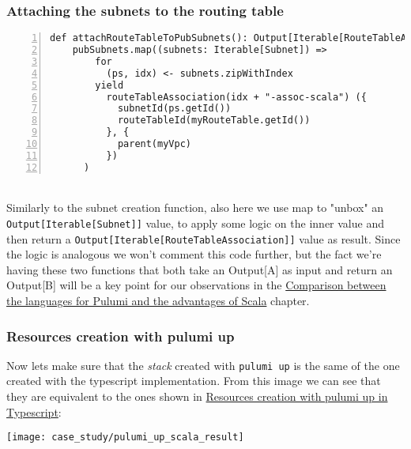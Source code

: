\subsubsection{Attaching the subnets to the routing table}
\begin{lstlisting}[numbers=left, numberstyle=\tiny, numbersep=-5pt, stepnumber=1]
  def attachRouteTableToPubSubnets(): Output[Iterable[RouteTableAssociation]] =
    pubSubnets.map((subnets: Iterable[Subnet]) =>
        for
          (ps, idx) <- subnets.zipWithIndex
        yield
          routeTableAssociation(idx + "-assoc-scala") ({
            subnetId(ps.getId())
            routeTableId(myRouteTable.getId())
          }, {
            parent(myVpc)
          })
      )
\end{lstlisting}\mbox{}\\
Similarly to the subnet creation function, also here we use map to "unbox" an \texttt{Output[Iterable[Subnet]]} value, to apply some logic on the inner value and then return a \texttt{Output[Iterable[RouteTableAssociation]]} value as result.
Since the logic is analogous we won't comment this code further, but the fact we're having these two functions that both take an Output[A] as input and return an Output[B] will be a key point for our observations in the \hyperref[cap:comparisons]{Comparison between the languages for Pulumi and the advantages of Scala} chapter.

\subsubsection{Resources creation with pulumi up}
\label{sssec:res-cre-ts}
Now lets make sure that the \textit{stack} created with \texttt{pulumi up} is the same of the one created with the typescript implementation.
From this image we can see that they are equivalent to the ones shown in \hyperref[sssec:res-cre-ts]{Resources creation with pulumi up in Typescript}:
\begin{center}
  \texttt{[image: case\_study/pulumi\_up\_scala\_result]} 
\end{center}\mbox{}\\

